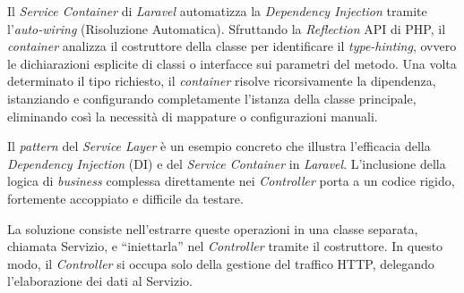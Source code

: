 Il \textit{Service Container} di \textit{Laravel} automatizza la \textit{Dependency Injection} tramite l’\textit{auto-wiring} (Risoluzione Automatica). Sfruttando la \textit{Reflection} API di PHP, il \textit{container} analizza il costruttore della classe per identificare il \textit{type-hinting}, ovvero le dichiarazioni esplicite di classi o interfacce sui parametri del metodo. Una volta determinato il tipo richiesto, il \textit{container} risolve ricorsivamente la dipendenza, istanziando e configurando completamente l’istanza della classe principale, eliminando così la necessità di mappature o configurazioni manuali.

Il \textit{pattern} del \textit{Service Layer} è un esempio concreto che illustra l’efficacia della \textit{Dependency Injection} (DI) e del \textit{Service Container} in \textit{Laravel}. L'inclusione della logica di \textit{business} complessa direttamente nei \textit{Controller} porta a un codice rigido, fortemente accoppiato e difficile da testare.

La soluzione consiste nell’estrarre queste operazioni in una classe separata, chiamata Servizio, e ``iniettarla'' nel \textit{Controller} tramite il costruttore. In questo modo, il \textit{Controller} si occupa solo della gestione del traffico HTTP, delegando l’elaborazione dei dati al Servizio.